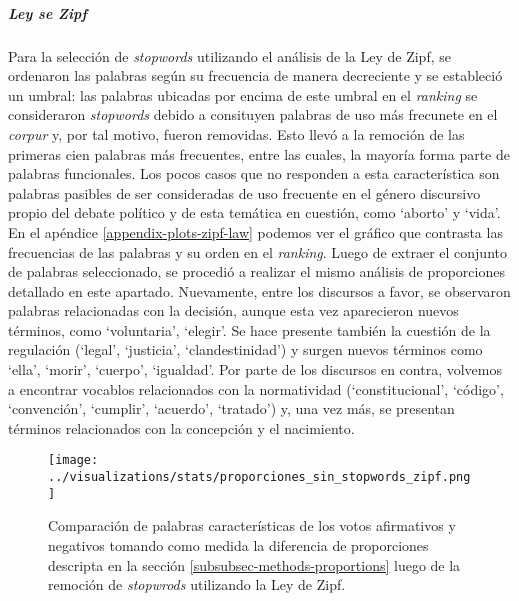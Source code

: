 \subparagraph{Ley se Zipf}
Para la selección de \textit{stopwords} utilizando el análisis de la Ley de Zipf,
se ordenaron las palabras según su frecuencia de manera decreciente y se estableció
un umbral: las palabras ubicadas por encima de este umbral en el \textit{ranking}
se consideraron \textit{stopwords} debido a consituyen palabras de uso más
frecunete en el \textit{corpur} y, por tal motivo, fueron removidas.
Esto llevó a la remoción de las primeras cien palabras más frecuentes, entre 
las cuales, la mayoría forma parte de palabras funcionales.
Los pocos casos que no responden a esta característica son palabras pasibles de
ser consideradas de uso frecuente en el género discursivo propio del debate político
y de esta temática en cuestión, como `aborto' y `vida'.
En el apéndice \ref{appendix-plots-zipf-law} podemos ver el gráfico que contrasta
las frecuencias de las palabras y su orden en el \textit{ranking}.
Luego de extraer el conjunto de palabras seleccionado, se procedió a realizar el
mismo análisis de proporciones detallado en este apartado. Nuevamente, entre
los discursos a favor, se observaron palabras relacionadas con la decisión, aunque
esta vez aparecieron nuevos términos, como `voluntaria', `elegir'. Se hace presente
también la cuestión de la regulación (`legal', `justicia', `clandestinidad') y
surgen nuevos términos como `ella', `morir', `cuerpo', `igualdad'.
Por parte de los discursos en contra, volvemos a encontrar vocablos relacionados
con la normatividad (`constitucional', `código', `convención', `cumplir', 
`acuerdo', `tratado') y, una vez más, se presentan términos relacionados
con la concepción y el nacimiento.

\begin{figure}[h!]
    \centering
    \texttt{[image: ../visualizations/stats/proporciones\_sin\_stopwords\_zipf.png]}
    \caption{Comparación de palabras características de los votos afirmativos y
    negativos tomando como medida la diferencia de proporciones descripta
    en la sección \ref{subsubsec-methods-proportions} luego de la remoción de
    \textit{stopwrods} utilizando la Ley de Zipf.}
    \label{fig-statistics-proportions-zipf}
\end{figure}

